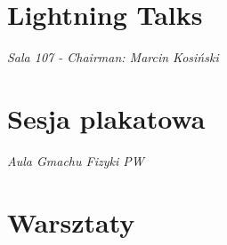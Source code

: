 \documentclass[11pt,twoside,b5paper]{book}
\begin{document}
\chapter{Lightning Talks}{\LARGE \textit{Sala 107 - Chairman: Marcin Kosiński}}





\newpage
\chapter{Sesja plakatowa}{\LARGE \textit{Aula Gmachu Fizyki PW}}



\newpage
\chapter{Warsztaty}{}

\newpage

\newpage

\newpage

\newpage

\newpage

\newpage

\newpage

\newpage

\newpage

\newpage

\newpage

\newpage

\newpage

\newpage

\newpage

\newpage

\newpage


\backmatter
\small \printindex[a]

\clearpage\phantom{}
 \thispagestyle{empty}
\clearpage\phantom{}
 \thispagestyle{empty}


\end{document}
